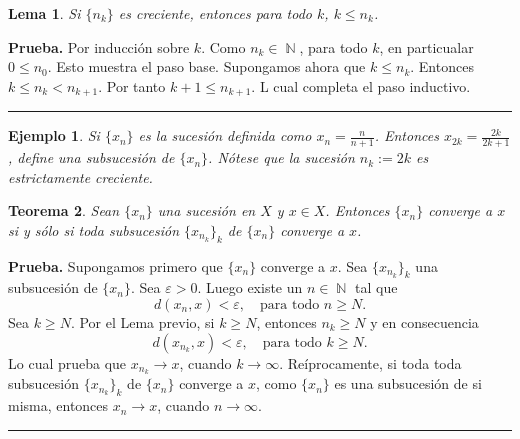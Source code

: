 \documentclass[x11names, 12pt]{book}
\newtheorem{teorema}{Teorema}
\newtheorem{lema}[teorema]{Lema}
\newtheorem{example}{Ejemplo}
\newenvironment{prueba}[1][Prueba]{\noindent\textbf{#1.} }{\ \rule{0.5em}{0.5em}}
\DeclareMathOperator{\ene}{\mathbb{N}}
\begin{document}
\begin{lema}
Si $\{n_k\}$ es creciente, entonces para todo $k$, $k\leq n_k$.
\end{lema}
\begin{prueba}
Por inducción sobre $k$. Como $n_k\in \ene$, para todo $k$, en particualar $0\leq n_0$. Esto muestra el paso base. Supongamos ahora que $k\leq n_k$. Entonces $k \leq n_k <n_{k+1}.$ Por tanto $k +1 \leq n_{k+1}.$ L cual completa el paso inductivo.
\end{prueba}


\begin{example}
Si $\{x_n\}$ es la sucesión definida como $x_n=\frac{n}{n+1}$. Entonces $x_{2k}=\frac{2k}{2k+1}$, define una subsucesión de $\{x_n\}$. Nótese que la sucesión $n_k:=2k$ es estrictamente creciente.
\end{example}

\begin{teorema}\label{suce-subsuc}
Sean $\{x_n\}$ una sucesión en $X$ y $x\in X$. Entonces $\{x_n\}$ converge a $x$ si y sólo si toda subsucesión $\{x_{n_k}\}_k$ de $\{x_n\}$ converge a $x$.
\end{teorema}
\begin{prueba}
Supongamos primero que $\{x_n\}$ converge a $x$. Sea $\{x_{n_k}\}_k$ una subsucesión de $\{x_n\}$. Sea $\varepsilon >0$. Luego existe un $n\in \ene$ tal que \[d(x_n,x) < \varepsilon, \quad \text{para todo $n\geq N$}.\]
Sea $k\geq N$. Por el Lema previo, si $k\geq N$, entonces $n_k \geq N$ y en consecuencia
\[d(x_{n_k},x) < \varepsilon, \quad \text{para todo $k\geq N$}.\]
Lo cual prueba que $x_{n_k}\to x$, cuando $k\to \infty .$
Reíprocamente, si toda toda subsucesión $\{x_{n_k}\}_k$ de $\{x_n\}$ converge a $x$, como $\{x_n\}$ es una subsucesión de si misma, entonces $x_n \to x$, cuando $n\to \infty .$
\end{prueba}
\end{document}
